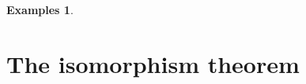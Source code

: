 \documentclass [12pt,oneside,a4paper,mathscr]{amsart}
\theoremstyle{definition}
\newtheorem{examples}[thm]{Examples}
\newcommand {\C}{\mathbb C}
\newcommand{\Z}{\mathbb Z}
\begin{document}
\begin{examples}
\begin{itemize}
%
%


\end{itemize}
\end{examples}




\section{The isomorphism theorem}
\end{document}
